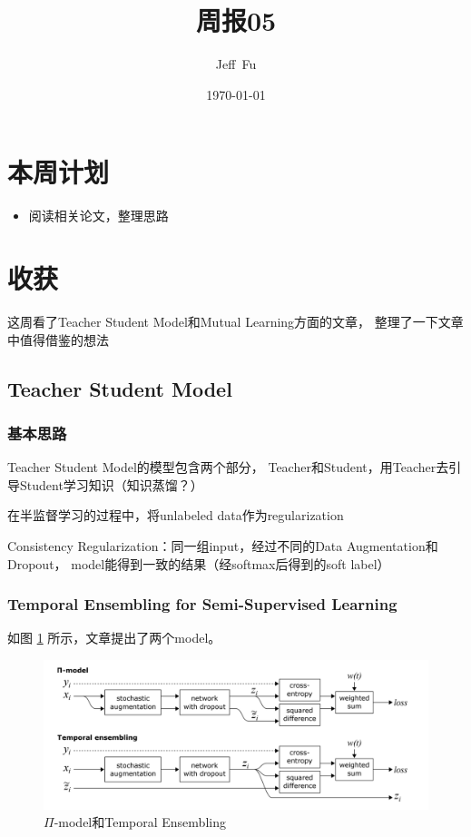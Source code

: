 \documentclass[UTF8]{ctexart}
\title{周报05}
\author{Jeff\ Fu}
\date{\today}
\begin{document}
    \maketitle
    \section{本周计划}
        \begin{itemize}
            \item 阅读相关论文，整理思路
        \end{itemize}
    \section{收获}
        这周看了Teacher Student Model和Mutual Learning方面的文章，
        整理了一下文章中值得借鉴的想法
        \subsection{Teacher Student Model}
            \subsubsection{基本思路}
                Teacher Student Model的模型包含两个部分，
                Teacher和Student，用Teacher去引导Student学习知识（知识蒸馏？）

                在半监督学习的过程中，将unlabeled data作为regularization

                Consistency Regularization：同一组input，经过不同的Data Augmentation和Dropout，
                model能得到一致的结果（经softmax后得到的soft label）
            \subsubsection{Temporal Ensembling for Semi-Supervised Learning}
                如图 \ref{fig:TE} 所示，文章提出了两个model。
                \begin{figure}[ht]
                    \centering
                    \includegraphics[scale=0.34]{Week05_Temporal_Ensembling.png}
                    \caption{$\Pi$-model和Temporal Ensembling}
                    \label{fig:TE}
                \end{figure}
\end{document}
